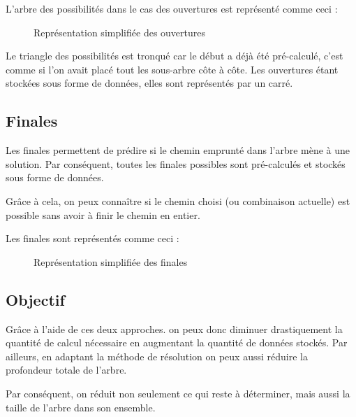 	L'arbre des possibilités dans le cas des ouvertures est représenté comme ceci :
	
	\begin{figure}[H]
		\begin{center}
				
		\end{center}
		
		\caption{Représentation simplifiée des ouvertures}
		\label{fig:ouvertures}
	\end{figure}
		
	Le triangle des possibilités est tronqué car le début a déjà été pré-calculé, c'est comme si l'on avait placé tout les sous-arbre côte à côte. Les ouvertures étant stockées sous forme de données, elles sont représentés par un carré.
\newpage

	\subsection{Finales}

	Les finales permettent de prédire si le chemin emprunté dans l'arbre mène à une solution. Par conséquent, toutes les finales possibles sont pré-calculés et stockés sous forme de données.
	
	Grâce à cela, on peux connaître si le chemin choisi (ou combinaison actuelle) est possible sans avoir à finir le chemin en entier.
	
	Les finales sont représentés comme ceci :
	
	\begin{figure}[H]
		\begin{center}
				
		\end{center}
		
		\caption{Représentation simplifiée des finales}
		\label{fig:finales}
	\end{figure}
	\newpage
	
	\subsection{Objectif}
	
	Grâce à l'aide de ces deux approches. on peux donc diminuer drastiquement la quantité de calcul nécessaire en augmentant la quantité de données stockés. Par ailleurs, en adaptant la méthode de résolution on peux aussi réduire la profondeur totale de l'arbre.
	
	Par conséquent, on réduit non seulement ce qui reste à déterminer, mais aussi la taille de l'arbre dans son ensemble.
	
